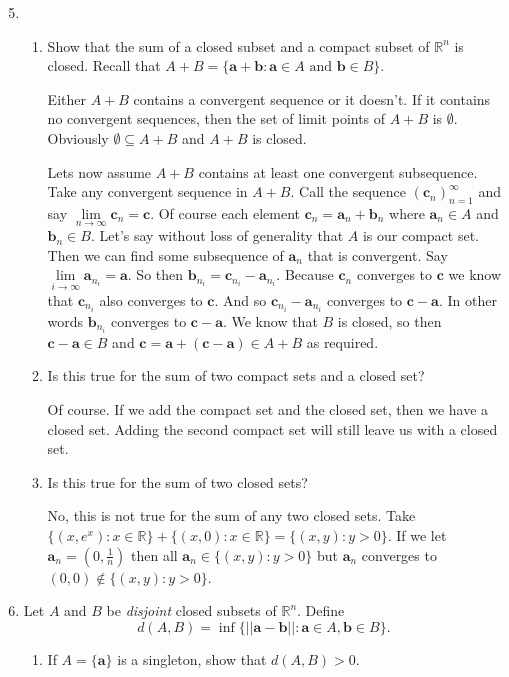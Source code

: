 \documentclass[letterpaper]{article}
\begin{document}
\begin{enumerate}
\begin{enumerate}
  \setcounter{enumii}{4}
  \item
    \begin{enumerate}
    \item
      Show that the sum of a closed subset and a compact subset of $\mathbb{R}^n$ is closed.
      Recall that $A+B=\{\boldsymbol{a}+\boldsymbol{b}:\boldsymbol{a}\in A\text{ and }\boldsymbol{b}\in B\}$.

      Either $A+B$ contains a convergent sequence or it doesn't.
      If it contains no convergent sequences, then the set of limit points of $A+B$ is $\emptyset$.
      Obviously $\emptyset\subseteq A+B$ and $A+B$ is closed.

      Lets now assume $A+B$ contains at least one convergent subsequence.
      Take any convergent sequence in $A+B$.
      Call the sequence $(\boldsymbol{c}_n)_{n=1}^\infty$ and say $\lim\limits_{n\to\infty}\boldsymbol{c}_n=\boldsymbol{c}$.
      Of course each element $\boldsymbol{c}_n=\boldsymbol{a}_n+\boldsymbol{b}_n$ where $\boldsymbol{a}_n\in A$ and $\boldsymbol{b}_n\in B$.
      Let's say without loss of generality that $A$ is our compact set.
      Then we can find some subsequence of $\boldsymbol{a}_n$ that is convergent.
      Say $\lim\limits_{i\to\infty}\boldsymbol{a}_{n_i}=\boldsymbol{a}$.
      So then $\boldsymbol{b}_{n_i}=\boldsymbol{c}_{n_i}-\boldsymbol{a}_{n_i}$.
      Because $\boldsymbol{c}_n$ converges to $\boldsymbol{c}$ we know that $\boldsymbol{c}_{n_i}$ also converges to $\boldsymbol{c}$.
      And so $\boldsymbol{c}_{n_i}-\boldsymbol{a}_{n_i}$ converges to $\boldsymbol{c}-\boldsymbol{a}$.
      In other words $\boldsymbol{b}_{n_i}$ converges to $\boldsymbol{c}-\boldsymbol{a}$.
      We know that $B$ is closed, so then $\boldsymbol{c}-\boldsymbol{a}\in B$ and $\boldsymbol{c}=\boldsymbol{a}+(\boldsymbol{c}-\boldsymbol{a})\in A+B$ as required.
    \item
      Is this true for the sum of two compact sets and a closed set?

      Of course.
      If we add the compact set and the closed set, then we have a closed set.
      Adding the second compact set will still leave us with a closed set.
    \item
      Is this true for the sum of two closed sets?

      No, this is not true for the sum of any two closed sets.
      Take $\{(x,e^x):x\in\mathbb{R}\}+\{(x,0):x\in \mathbb{R}\}=\{(x,y):y>0\}$.
      If we let $\boldsymbol{a}_n=(0,\frac{1}{n})$ then all $\boldsymbol{a}_n\in \{(x,y):y>0\}$ but $\boldsymbol{a}_n$ converges to $(0,0)\not\in\{(x,y):y> 0\}$.
    \end{enumerate}
  \setcounter{enumii}{8}
  \item
    Let $A$ and $B$ be {\em disjoint} closed subsets of $\mathbb{R}^n$. Define
    \[d(A,B)=\inf\{||\boldsymbol{a-b}||:\boldsymbol{a}\in A,\boldsymbol{b}\in B\}.\]
    \begin{enumerate}
    \item
      If $A=\{\boldsymbol{a}\}$ is a singleton, show that $d(A,B)>0$.


\end{enumerate}
\end{enumerate}
\end{enumerate}
\end{document}
